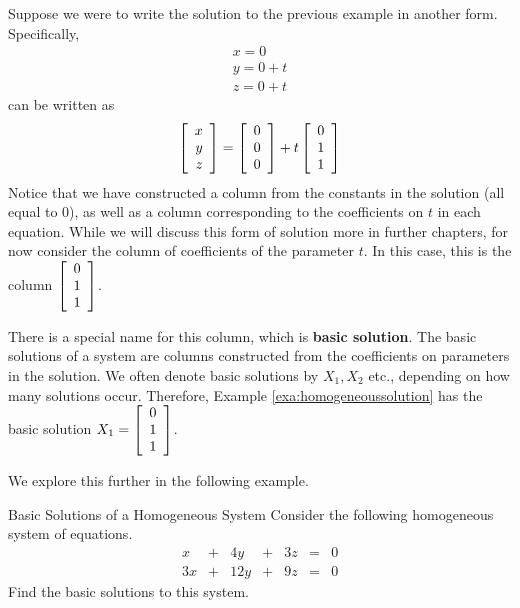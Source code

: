 Suppose we were to write the solution to the previous example in another form.
Specifically,
\begin{equation*}
\begin{array}{c}
x = 0 \\
y = 0 + t \\
z = 0 + t
\end{array}
\end{equation*}
can be written as 
\begin{equation*}
\left[
\begin{array}{r}
x\\
y\\
z
\end{array}
\right]
 =
\left[
\begin{array}{r}
0\\
0\\
0
\end{array}
\right]
 +
t
\left[
\begin{array}{r}
0\\
1\\
1
\end{array}
\right]
\end{equation*}
Notice that we have constructed a column from the constants in the solution (all equal to $0$),
 as well as a column corresponding to the 
coefficients on $t$ in each equation. While we will discuss this form of solution more in further chapters, 
for now consider the column of coefficients 
of the parameter $t$. In this case, this is the column
$\left[
\begin{array}{r}
0\\
1\\
1
\end{array}
\right]$. 

There is a special name for this column, which is \textbf{basic solution}. The basic solutions of a system 
are columns constructed from the coefficients on parameters in the solution. We often denote basic solutions 
by $X_1, X_2$ etc., depending on how many solutions occur. Therefore, Example \ref{exa:homogeneoussolution}
has the basic solution $X_1 = \left[
\begin{array}{r}
0\\
1\\
1
\end{array}
\right]$. 

We explore this further in the following example. 

\begin{example}{Basic Solutions of a Homogeneous System}\label{exa:basicsolutions}
Consider the following homogeneous system of equations. 
\begin{equation*}
\begin{array}{cccccccc}
x &+& 4y &+& 3z &=& 0 \\
3x &+& 12y &+& 9z &=& 0
\end{array}
\end{equation*}
Find the basic solutions to this system.
\end{example}

